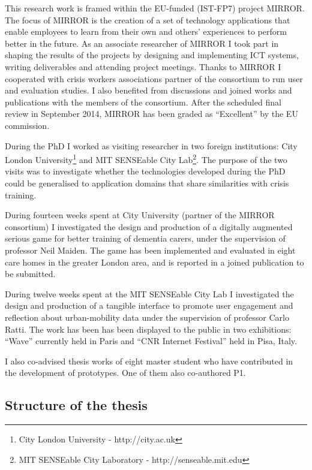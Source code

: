 This research work is framed within the EU-funded (IST-FP7) project
MIRROR. The focus of MIRROR is the creation of a set of technology
applications that enable employees to learn from their own and others'
experiences to perform better in the future. As an associate researcher
of MIRROR I took part in shaping the results of the projects by
designing and implementing ICT systems, writing deliverables and
attending project meetings. Thanks to MIRROR I cooperated with crisis
workers associations partner of the consortium to run user and
evaluation studies. I also benefited from discussions and joined works
and publications with the members of the consortium. After the scheduled
final review in September 2014, MIRROR has been graded as ``Excellent''
by the EU commission.

During the PhD I worked as visiting researcher in two foreign
institutions: City London University\footnote{City London University -
  http://city.ac.uk} and MIT SENSEable City Lab\footnote{MIT SENSEable
  City Laboratory - http://senseable.mit.edu}. The purpose of the two
visits was to investigate whether the technologies developed during the
PhD could be generalised to application domains that share similarities
with crisis training.

During fourteen weeks spent at City University (partner of the MIRROR
consortium) I investigated the design and production of a digitally
augmented serious game for better training of dementia carers, under the
supervision of professor Neil Maiden. The game has been implemented and
evaluated in eight care homes in the greater London area, and is
reported in a joined publication to be submitted.

During twelve weeks spent at the MIT SENSEable City Lab I investigated
the design and production of a tangible interface to promote user
engagement and reflection about urban-mobility data under the
supervision of professor Carlo Ratti. The work has been has been
displayed to the public in two exhibitions: ``Wave'' currently held in
Paris and ``CNR Internet Festival'' held in Pisa, Italy.

I also co-advised thesis works of eight master student who have
contributed in the development of prototypes. One of them also
co-authored P1.

\subsection{Structure of the thesis}\label{structure-of-the-thesis}

